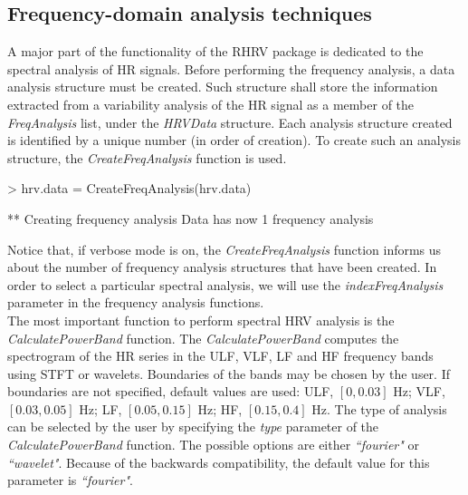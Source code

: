 \documentclass[12pt,lot, lof]{puthesis}
\begin{document}
\subsection{Frequency-domain analysis techniques\label{sec:quickFreq}}
A major part of the functionality of the RHRV package is dedicated to the 
spectral analysis of \gls{HR} signals. Before performing the frequency 
analysis, a data analysis structure must be created. Such structure shall store 
the information extracted from a variability analysis of the \gls{HR} signal as 
a member of the \textit{FreqAnalysis} list, under the \textit{HRVData} 
structure. Each analysis structure created is identified by a unique number (in 
order of creation). To create such  an analysis structure, the 
\textit{CreateFreqAnalysis} function is  used. \\
\begin{Schunk}
\begin{Sinput}
> hrv.data = CreateFreqAnalysis(hrv.data)
\end{Sinput}
\begin{Soutput}
** Creating frequency analysis
   Data has now 1 frequency analysis
\end{Soutput}
\end{Schunk}
Notice that, if verbose mode is on, the \textit{CreateFreqAnalysis} function 
informs us about
the number of frequency analysis structures that have been created. In order to 
select a 
particular spectral analysis, we will use the \textit{indexFreqAnalysis} 
parameter in the 
frequency analysis functions.\\

The most important function to perform spectral \gls{HRV} analysis is the 
\textit{CalculatePowerBand} function. The \textit{CalculatePowerBand} computes 
the
spectrogram of the \gls{HR} series in the \gls{ULF},
\gls{VLF}, \gls{LF} and \gls{HF} frequency bands using STFT or wavelets. 
Boundaries of the bands may be chosen 
by the user. If boundaries are not specified, default values 
are used: ULF, $\left[ 0,0.03\right] $ Hz;
VLF, $\left[ 0.03,0.05\right] $ Hz;  LF, $\left[ 0.05,0.15\right] $ Hz; HF, $%
\left[ 0.15,0.4\right] $ Hz. 
 The type of analysis can be selected by the user by specifying the 
\textit{type} parameter of the 
\textit{CalculatePowerBand} function. The possible options are either 
\textit{``fourier"} or \textit{``wavelet"}. Because of the backwards 
compatibility,
the default value for this parameter is \textit{``fourier"}. \\
\end{document}
